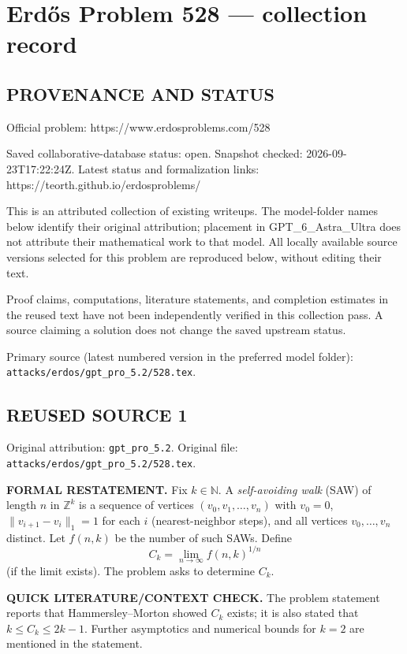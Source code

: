 \section*{Erd\H{o}s Problem 528 --- collection record}

\subsection*{PROVENANCE AND STATUS}
Official problem: https://www.erdosproblems.com/528

Saved collaborative-database status: open.
Snapshot checked: 2026-09-23T17:22:24Z.
Latest status and formalization links: https://teorth.github.io/erdosproblems/

This is an attributed collection of existing writeups. The model-folder names below identify their original attribution; placement in GPT\_6\_Astra\_Ultra does not attribute their mathematical work to that model. All locally available source versions selected for this problem are reproduced below, without editing their text.

Proof claims, computations, literature statements, and completion estimates in the reused text have not been independently verified in this collection pass. A source claiming a solution does not change the saved upstream status.

Primary source (latest numbered version in the preferred model folder): \texttt{attacks/erdos/gpt\_pro\_5.2/528.tex}.

\subsection*{REUSED SOURCE 1}
Original attribution: \texttt{gpt\_pro\_5.2}.
Original file: \texttt{attacks/erdos/gpt\_pro\_5.2/528.tex}.


\noindent\textbf{FORMAL RESTATEMENT.}
Fix $k\in\mathbb N$.
A \emph{self-avoiding walk} (SAW) of length $n$ in $\mathbb Z^k$ is a sequence of vertices $(v_0,v_1,\dots,v_n)$ with $v_0=0$, $\|v_{i+1}-v_i\|_1=1$ for each $i$ (nearest-neighbor steps), and all vertices $v_0,\dots,v_n$ distinct.
Let $f(n,k)$ be the number of such SAWs.
Define
\[C_k = \lim_{n\to\infty} f(n,k)^{1/n}
\]
(if the limit exists). The problem asks to determine $C_k$.

\bigskip
\noindent\textbf{QUICK LITERATURE/CONTEXT CHECK.}
The problem statement reports that Hammersley--Morton showed $C_k$ exists; it is also stated that $k\le C_k\le 2k-1$. Further asymptotics and numerical bounds for $k=2$ are mentioned in the statement.

